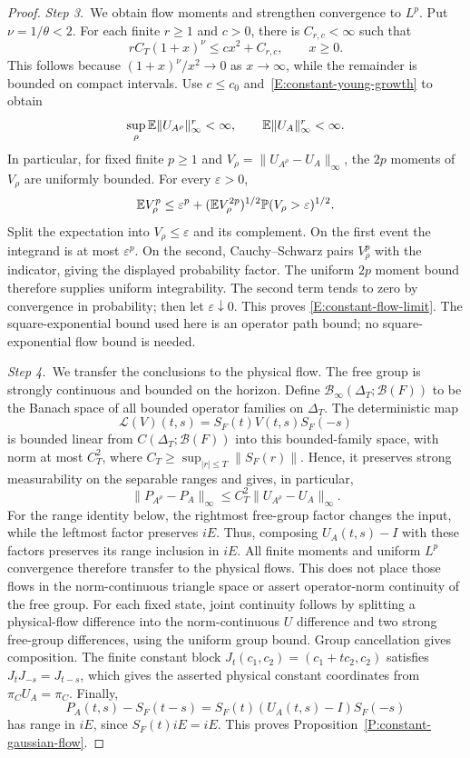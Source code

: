 \begin{proof}
  \medskip
  \noindent\textit{Step 3.~}We obtain flow moments and strengthen convergence
  to $L^p$.
  Put $\nu = 1/\theta < 2$. For each finite $r \ge 1$ and $c > 0$, there is
  $C_{r,c} < \infty$ such that
  \[
    rC_T(1+x)^\nu\le cx^2+C_{r,c},\qquad x\ge0.
  \]
  This follows because $(1+x)^\nu/x^2 \to 0$ as $x \to \infty$, while the
  remainder is bounded on compact intervals. Use $c \le c_0$
  and~\eqref{E:constant-young-growth} to obtain
  \[
    \sup_\rho\mathbb{E}\|U_{A^\rho}\|_\infty^r<\infty,\qquad
    \mathbb{E}\|U_A\|_\infty^r<\infty.
  \]
  In particular, for fixed finite $p \ge 1$ and $V_\rho =
  \|U_{A^\rho}-U_A\|_\infty$, the $2p$ moments of $V_\rho$ are uniformly
  bounded. For every $\varepsilon > 0$,
  \[
    \mathbb{E} V_\rho^p
    \le\varepsilon^p+
    (\mathbb{E} V_\rho^{2p})^{1/2}
    \mathbb{P}(V_\rho>\varepsilon)^{1/2}.
  \]
  Split the expectation into $V_\rho \le \varepsilon$ and its complement. On
  the first event the integrand is at most $\varepsilon^p$. On the second,
  Cauchy--Schwarz pairs $V_\rho^p$ with the indicator, giving the displayed
  probability factor. The uniform $2p$ moment bound therefore supplies uniform
  integrability.
  The second term tends to zero by convergence in probability; then let
  $\varepsilon\downarrow0$. This proves \eqref{E:constant-flow-limit}. The
  square-exponential bound used here is an operator path bound; no
  square-exponential flow bound is needed.

  \medskip
  \noindent\textit{Step 4.~}We transfer the conclusions to the physical flow.
  The free group is strongly continuous and bounded on the horizon. Define
  $\mathcal{B}_\infty(\Delta_T;\mathcal{B}(F))$ to be the Banach space of all
  bounded operator families on $\Delta_T$. The deterministic map
  \[
    \mathcal{L}(V)(t,s)=S_F(t)V(t,s)S_F(-s)
  \]
  is bounded linear from $C(\Delta_T;\mathcal{B}(F))$ into this bounded-family
  space, with norm at most $C_T^2$, where $C_T \ge \sup_{|r|\le T}\|S_F(r)\|$.
  Hence, it preserves strong measurability on the separable ranges and gives, in
  particular,
  \[
    \|P_{A^\rho}-P_A\|_\infty
    \le C_T^2\|U_{A^\rho}-U_A\|_\infty.
  \]
  For the range identity below, the rightmost free-group factor changes
  the input, while the leftmost factor preserves $iE$. Thus, composing
  $U_A(t,s)-I$ with these factors preserves its range inclusion in $iE$.
  All finite moments and uniform $L^p$ convergence therefore transfer to the
  physical flows. This does not place those flows in the norm-continuous
  triangle space or assert operator-norm continuity of the free group. For each
  fixed state, joint continuity follows by splitting a physical-flow difference
  into the norm-continuous $U$ difference and two strong free-group differences,
  using the uniform group bound. Group cancellation gives composition. The
  finite constant block $J_t(c_1,c_2) = (c_1+tc_2,c_2)$ satisfies $J_tJ_{-s} =
  J_{t-s}$, which gives the asserted physical constant coordinates from
  $\pi_CU_A = \pi_C$. Finally,
  \[
    P_A(t,s)-S_F(t-s)
    =S_F(t)(U_A(t,s)-I)S_F(-s)
  \]
  has range in $iE$, since $S_F(t)iE = iE$. This proves
  Proposition~\ref{P:constant-gaussian-flow}.
\end{proof}

